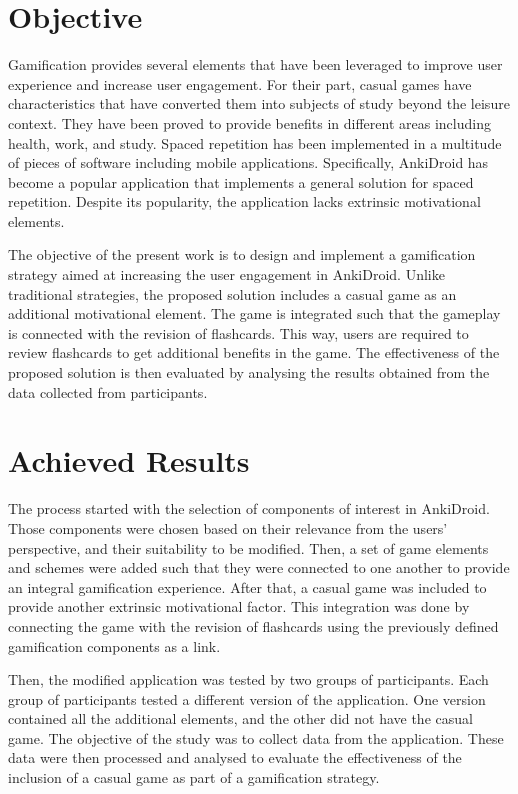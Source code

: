 \section{Objective}
Gamification provides several elements that have been leveraged to improve user experience and increase user engagement. For their part, casual games have characteristics that have converted them into subjects of study beyond the leisure context. They have been proved to provide benefits in different areas including health, work, and study. Spaced repetition has been implemented in a multitude of pieces of software including mobile applications. Specifically, AnkiDroid \citep{raoul2012ankidroid} has become a popular application that implements a general solution for spaced repetition. Despite its popularity, the application lacks extrinsic motivational elements.

The objective of the present work is to design and implement a gamification strategy aimed at increasing the user engagement in AnkiDroid. Unlike traditional strategies, the proposed solution includes a casual game as an additional motivational element. The game is integrated such that the gameplay is connected with the revision of flashcards. This way, users are required to review flashcards to get additional benefits in the game.
The effectiveness of the proposed solution is then evaluated by analysing the results obtained from the data collected from participants.


\section{Achieved Results}
The process started with the selection of components of interest in AnkiDroid. Those components were chosen based on their relevance from the users' perspective, and their suitability to be modified. Then, a set of game elements and schemes were added such that they were connected to one another to provide an integral gamification experience. After that, a casual game was included to provide another extrinsic motivational factor. This integration was done by connecting the game with the revision of flashcards using the previously defined gamification components as a link.

Then, the modified application was tested by two groups of participants. Each group of participants tested a different version of the application. One version contained all the additional elements, and the other did not have the casual game. The objective of the study was to collect data from the application. These data were then processed and analysed to evaluate the effectiveness of the inclusion of a casual game as part of a gamification strategy.

